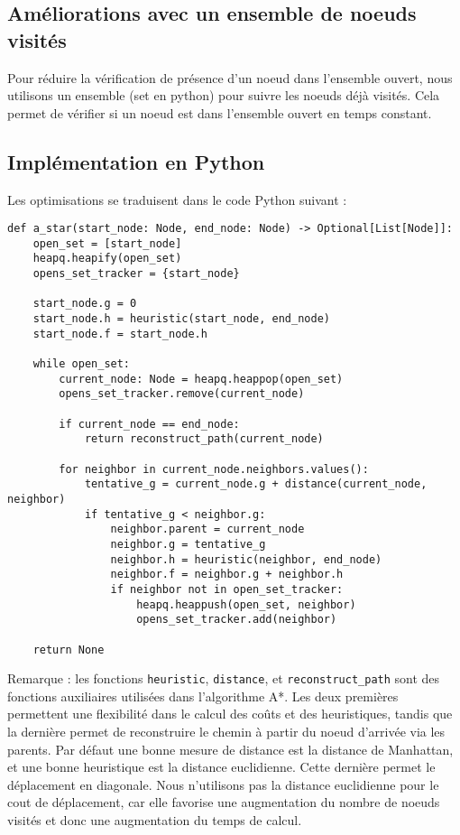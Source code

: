 \subsection{Améliorations avec un ensemble de noeuds visités}
Pour réduire la vérification de présence d'un noeud dans l'ensemble ouvert, nous utilisons un ensemble (set en python) pour suivre les noeuds déjà visités. Cela permet de vérifier si un noeud est dans l'ensemble ouvert en temps constant.

\subsection{Implémentation en Python}
Les optimisations se traduisent dans le code Python suivant :

\begin{verbatim}
def a_star(start_node: Node, end_node: Node) -> Optional[List[Node]]:
    open_set = [start_node]
    heapq.heapify(open_set)
    opens_set_tracker = {start_node}

    start_node.g = 0
    start_node.h = heuristic(start_node, end_node)
    start_node.f = start_node.h

    while open_set:
        current_node: Node = heapq.heappop(open_set)
        opens_set_tracker.remove(current_node)

        if current_node == end_node:
            return reconstruct_path(current_node)

        for neighbor in current_node.neighbors.values():
            tentative_g = current_node.g + distance(current_node, neighbor)
            if tentative_g < neighbor.g:
                neighbor.parent = current_node
                neighbor.g = tentative_g
                neighbor.h = heuristic(neighbor, end_node)
                neighbor.f = neighbor.g + neighbor.h
                if neighbor not in open_set_tracker:
                    heapq.heappush(open_set, neighbor)
                    opens_set_tracker.add(neighbor)

    return None
\end{verbatim}

Remarque : les fonctions \texttt{heuristic}, \texttt{distance}, et \texttt{reconstruct\_path} sont des fonctions auxiliaires utilisées dans l'algorithme A*. Les deux premières permettent une flexibilité dans le calcul des coûts et des heuristiques, tandis que la dernière permet de reconstruire le chemin à partir du noeud d'arrivée via les parents. Par défaut une bonne mesure de distance est la distance de Manhattan, et une bonne heuristique est la distance euclidienne. Cette dernière permet le déplacement en diagonale. Nous n'utilisons pas la distance euclidienne pour le cout de déplacement, car elle favorise une augmentation du nombre de noeuds visités et donc une augmentation du temps de calcul.

